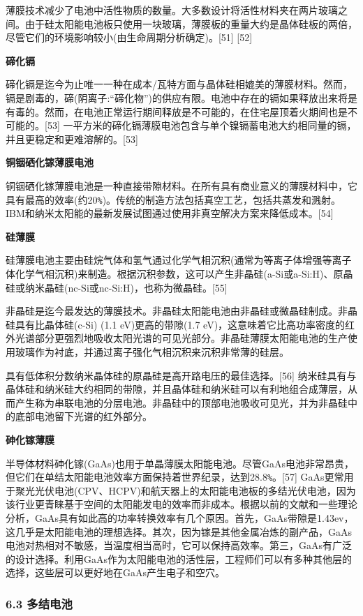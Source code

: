 薄膜技术减少了电池中活性物质的数量。大多数设计将活性材料夹在两片玻璃之间。由于硅太阳能电池板只使用一块玻璃，薄膜板的重量大约是晶体硅板的两倍，尽管它们的环境影响较小(由生命周期分析确定)。[51] [52]

\textbf{碲化镉}

碲化镉是迄今为止唯一一种在成本/瓦特方面与晶体硅相媲美的薄膜材料。然而，镉是剧毒的，碲(阴离子:“碲化物”)的供应有限。电池中存在的镉如果释放出来将是有毒的。然而，在电池正常运行期间释放是不可能的，在住宅屋顶着火期间也是不可能的。[53] 一平方米的碲化镉薄膜电池包含与单个镍镉蓄电池大约相同量的镉，并且更稳定和更难溶解的。[53]

\textbf{铜铟硒化镓薄膜电池}

铜铟硒化镓薄膜电池是一种直接带隙材料。在所有具有商业意义的薄膜材料中，它具有最高的效率(约20\verb`%`)。传统的制造方法包括真空工艺，包括共蒸发和溅射。IBM和纳米太阳能的最新发展试图通过使用非真空解决方案来降低成本。[54]

\textbf{硅薄膜}

硅薄膜电池主要由硅烷气体和氢气通过化学气相沉积(通常为等离子体增强等离子体化学气相沉积)来制造。根据沉积参数，这可以产生非晶硅(a-Si或a-Si:H)、原晶硅或纳米晶硅(nc-Si或nc-Si:H)，也称为微晶硅。[55]

非晶硅是迄今最发达的薄膜技术。非晶硅太阳能电池由非晶硅或微晶硅制成。非晶硅具有比晶体硅(c-Si) (1.1 eV)更高的带隙(1.7 eV)，这意味着它比高功率密度的红外光谱部分更强烈地吸收太阳光谱的可见光部分。非晶硅薄膜太阳能电池的生产使用玻璃作为衬底，并通过离子强化气相沉积来沉积非常薄的硅层。

具有低体积分数纳米晶体硅的原晶硅是高开路电压的最佳选择。[56] 纳米硅具有与晶体硅和纳米硅大约相同的带隙，并且晶体硅和纳米硅可以有利地组合成薄层，从而产生称为串联电池的分层电池。非晶硅中的顶部电池吸收可见光，并为非晶硅中的底部电池留下光谱的红外部分。

\textbf{砷化镓薄膜}

半导体材料砷化镓(GaAs)也用于单晶薄膜太阳能电池。尽管GaAs电池非常昂贵，但它们在单结太阳能电池效率方面保持着世界纪录，达到28.8\verb`%`。[57] GaAs更常用于聚光光伏电池(CPV、HCPV)和航天器上的太阳能电池板的多结光伏电池，因为该行业更青睐基于空间的太阳能发电的效率而非成本。根据以前的文献和一些理论分析，GaAs具有如此高的功率转换效率有几个原因。首先，GaAs带隙是1.43ev，这几乎是太阳能电池的理想选择。其次，因为镓是其他金属冶炼的副产品，GaAs电池对热相对不敏感，当温度相当高时，它可以保持高效率。第三，GaAs有广泛的设计选择。利用GaAs作为太阳能电池的活性层，工程师们可以有多种其他层的选择，这些层可以更好地在GaAs产生电子和空穴。

\subsubsection{6.3 多结电池}

